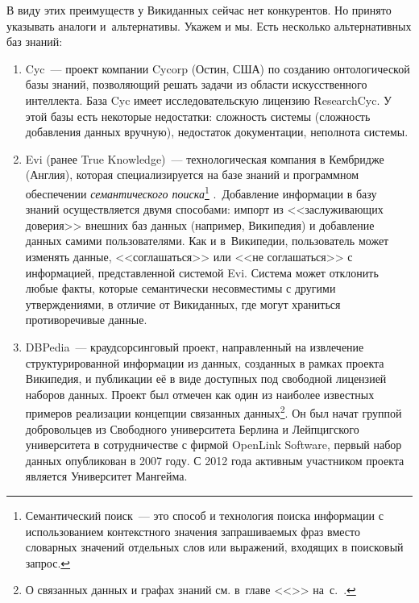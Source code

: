 В виду этих преимуществ у Викиданных сейчас нет конкурентов. 
Но принято указывать аналоги и~альтернативы. Укажем и мы. Есть несколько альтернативных баз знаний:
\begin{enumerate}
\item Cyc~--- проект компании Cycorp (Остин, США) по созданию онтологической базы знаний, 
    позволяющий решать задачи из области искусственного интеллекта. База Cyc имеет исследовательскую лицензию ResearchCyc. У этой базы есть некоторые недостатки: сложность системы (сложность добавления данных
вручную), недостаток документации, неполнота системы.
\item Evi (ранее True Knowledge)~--- 
    технологическая компания в Кембридже (Англия), 
        которая специализируется на базе знаний и программном обеспечении 
        \textit{семантического поиска}\footnote[][1\baselineskip]{%
            Семантический поиск~--- 
            это способ и технология поиска информации с использованием контекстного значения запрашиваемых фраз 
            вместо словарных значений отдельных слов или выражений, входящих в поисковый запрос.}%
.\,     Добавление информации в базу знаний осуществляется двумя способами: импорт из <<заслуживающих доверия>> внешних баз данных (например, Википедия) и добавление данных самими пользователями. Как и в~Википедии, пользователь может изменять
данные, <<соглашаться>> или <<не соглашаться>> с информацией, представленной системой Evi. Система может отклонить любые факты, которые семантически несовместимы с другими утверждениями, в отличие от Викиданных, где могут
храниться противоречивые данные.
\item DBPedia~--- краудсорсинговый проект, 
    направленный на извлечение структурированной информации из данных, 
        созданных в рамках проекта Википедия, 
        и публикации её в виде доступных под свободной лицензией наборов данных. 
        Проект был отмечен как один из наиболее известных примеров реализации 
        концепции связанных данных\footnote[][]{%
%
О связанных данных и графах знаний см. в~главе <<>> на~с.~\pageref{ch:BucketsAndBalls}.%
%
}.      Он был начат группой добровольцев из Свободного университета Берлина и Лейпцигского университета 
        в сотрудничестве с фирмой OpenLink Software, первый набор данных опубликован в 2007 году. 
        С 2012 года активным участником проекта является Университет Мангейма.%
\end{enumerate}

